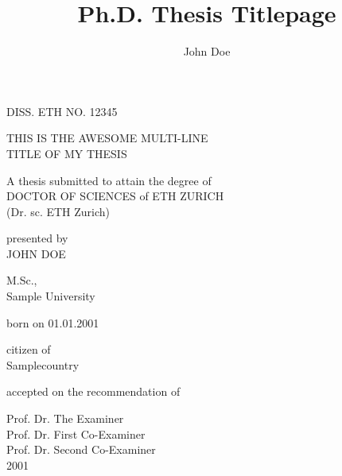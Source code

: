 \documentclass{scrartcl}
\title{Ph.D. Thesis Titlepage} %
\author{John Doe} %
\begin{document}
\pagestyle{empty}

\begin{centering}

\vspace{1cm}
DISS. ETH NO. 12345

\vspace*{1.5cm}
{
{\huge \uppercase{This is the Awesome Multi-Line\\Title of my Thesis}\par}
}
\vspace*{1cm}

{
A thesis submitted to attain the degree of\\
DOCTOR OF SCIENCES of ETH ZURICH\\
(Dr. sc. ETH Zurich)\par
}
\vspace*{1cm}

{
presented by\\
\uppercase{John Doe}\par
}

\vspace*{1cm}
M.Sc.,\\
Sample University\\
\vspace*{1cm}

born on 01.01.2001\\
\vspace*{0.5cm}

citizen of\\
Samplecountry\\
\vspace*{2cm}

accepted on the recommendation of\\
\vspace*{0.5cm}

Prof. Dr. The Examiner\\
Prof. Dr. First Co-Examiner\\
Prof. Dr. Second Co-Examiner\\
\vspace*{3cm}
2001\\

\end{centering}
\end{document}
